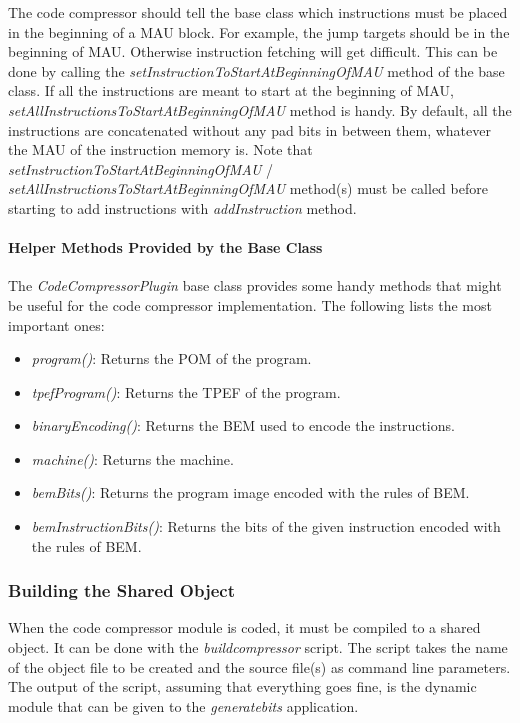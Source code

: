 \documentclass[twoside]{tceusermanual}
\begin{document}
The code compressor should tell the base class which instructions must be
placed in the beginning of a MAU block. For example, the jump targets
should be in the beginning of MAU. Otherwise instruction fetching will
get difficult. This can be done by calling the
\emph{setInstructionToStartAtBeginningOfMAU} method of the base class. If all
the instructions are meant to start at the beginning of MAU,
\emph{setAllInstructionsToStartAtBeginningOfMAU} method is handy. By default,
all the instructions are concatenated without any pad bits in between
them, whatever the MAU of the instruction memory is. Note
that \emph{setInstructionToStartAtBeginningOfMAU} /
\emph{setAllInstructionsToStartAtBeginningOfMAU} method(s) must be called
before starting to add instructions with \emph{addInstruction} method.

\paragraph{Helper Methods Provided by the Base Class}

The \emph{CodeCompressorPlugin} base class provides some handy methods
that might be useful for the code compressor implementation. The
following lists the most important ones: 

\begin{itemize}
\item \emph{program()}: Returns the POM of the program.
\item \emph{tpefProgram()}: Returns the TPEF of the program.
\item \emph{binaryEncoding()}: Returns the BEM used to encode the instructions.
\item \emph{machine()}: Returns the machine.
\item \emph{bemBits()}: Returns the program image encoded with the rules of BEM.
\item \emph{bemInstructionBits()}: Returns the bits of the given instruction
encoded with the rules of BEM.
\end{itemize}


\subsubsection{Building the Shared Object}

When the code compressor module is coded, it must be compiled to a
shared object. It can be done with the \emph{buildcompressor}
script. The script takes the name of the object file to be created and
the source file(s) as command line parameters. The output of the
script, assuming that everything goes fine, is the dynamic module that
can be given to the \emph{generatebits} application.
\end{document}
